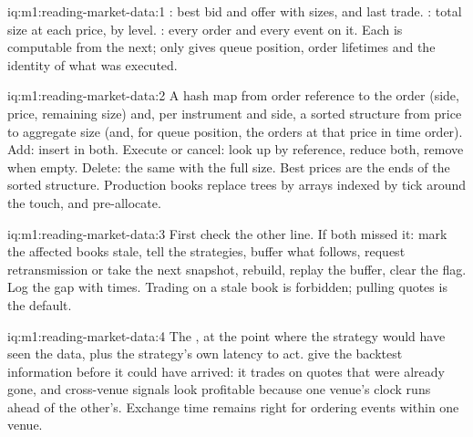 \begin{solution}{iq:m1:reading-market-data:1}
: best bid and offer with sizes, and last trade. : total size
at each price, by level. : every order and every event on it. Each is
computable from the next; only  gives queue position, order
lifetimes and the identity of what was executed.
\end{solution}

\begin{solution}{iq:m1:reading-market-data:2}
A hash map from order reference to the order (side, price, remaining size)
and, per instrument and side, a sorted structure from price to aggregate
size (and, for queue position, the orders at that price in time order). Add:
insert in both. Execute or cancel: look up by reference, reduce both, remove
when empty. Delete: the same with the full size. Best prices are the ends of
the sorted structure. Production books replace trees by arrays indexed by
tick around the touch, and pre-allocate.
\end{solution}

\begin{solution}{iq:m1:reading-market-data:3}
First check the other line. If both missed it: mark the affected books
stale, tell the strategies, buffer what follows, request retransmission or
take the next snapshot, rebuild, replay the buffer, clear the flag. Log the
gap with times. Trading on a stale book is forbidden; pulling quotes is the
default.
\end{solution}

\begin{solution}{iq:m1:reading-market-data:4}
The , at the point where the strategy would have seen the
data, plus the strategy's own latency to act.  give the
backtest information before it could have arrived: it trades on quotes that
were already gone, and cross-venue signals look profitable because one
venue's clock runs ahead of the other's. Exchange time remains right for
ordering events within one venue.
\end{solution}

